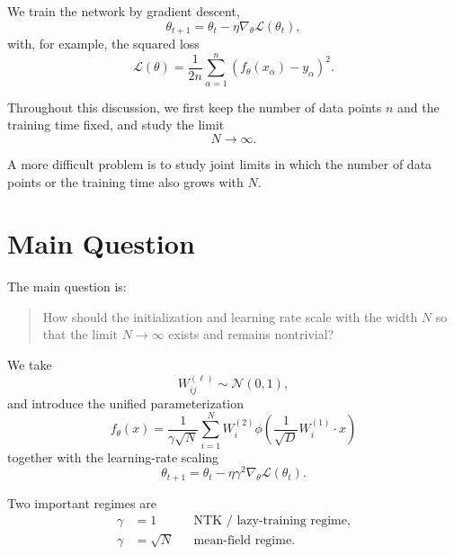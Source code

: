 We train the network by gradient descent,
\begin{equation}
    \theta_{t+1}
    =
    \theta_t
    -
    \eta \nabla_\theta \mathcal{L}(\theta_t),
\end{equation}
with, for example, the squared loss
\begin{equation}
    \mathcal{L}(\theta)
    =
    \frac{1}{2n}
    \sum_{\alpha=1}^{n}
    \left(
        f_\theta(x_\alpha)-y_\alpha
    \right)^2.
\end{equation}

Throughout this discussion, we first keep the number of data points \(n\)
and the training time fixed, and study the limit
\[
N\rightarrow\infty.
\]

A more difficult problem is to study joint limits in which
the number of data points or the training time also grows with \(N\).

\section{Main Question}

The main question is:

\begin{quote}
How should the initialization and learning rate scale with the width \(N\)
so that the limit \(N\rightarrow\infty\) exists and remains nontrivial?
\end{quote}

We take
\begin{equation}
    W_{ij}^{(\ell)}
    \sim
    \mathcal{N}(0,1),
\end{equation}
and introduce the unified parameterization
\begin{equation}
    \boxed{
    f_\theta(x)
    =
    \frac{1}{\gamma\sqrt{N}}
    \sum_{i=1}^{N}
    W_i^{(2)}
    \phi\!\left(
        \frac{1}{\sqrt{D}}
        W_i^{(1)}\cdot x
    \right)
    }
\end{equation}
together with the learning-rate scaling
\begin{equation}
    \boxed{
    \theta_{t+1}
    =
    \theta_t
    -
    \eta\gamma^2
    \nabla_\theta \mathcal{L}(\theta_t).
    }
\end{equation}

Two important regimes are
\begin{align}
    \gamma &= 1
    &&\text{NTK / lazy-training regime},\\
    \gamma &= \sqrt{N}
    &&\text{mean-field regime}.
\end{align}

